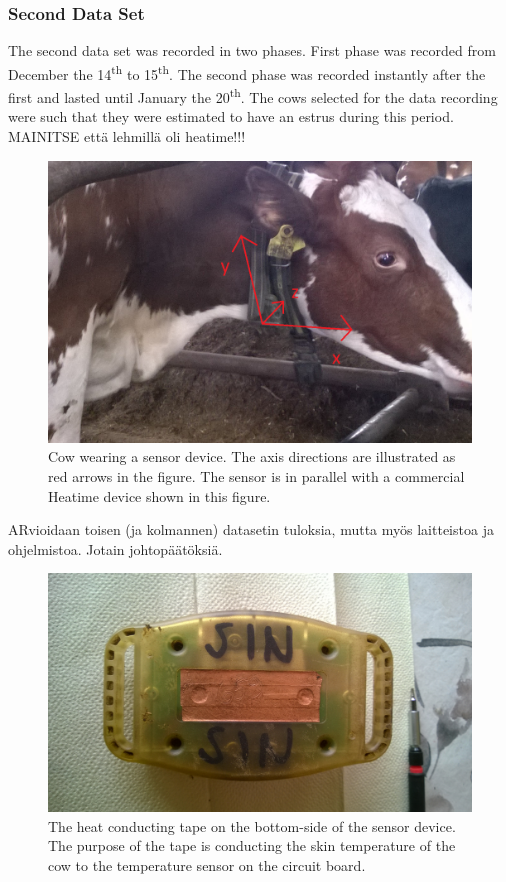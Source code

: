 \documentclass[english,12pt,a4paper,pdftex,elec,utf8]{aaltothesis}
\begin{document}
\subsubsection*{Second Data Set} \label{seconddatasetsection}

The second data set was recorded in two phases. First phase was recorded from December the 14\textsuperscript{th} to 15\textsuperscript{th}. The second phase was recorded instantly after the first and lasted until January the 20\textsuperscript{th}. The cows selected for the data recording were such that they were estimated to have an estrus during this period. \\

MAINITSE että lehmillä oli heatime!!!

\begin{figure}[thb]
\centering
\includegraphics[width = 0.75 \textwidth]{figures/sensorikaulassa1.png}
\caption{Cow wearing a sensor device. The axis directions are illustrated as red arrows in the figure. The sensor is in parallel with a commercial Heatime device shown in this figure.}\label{sensorikaulassakuva}
\end{figure}

ARvioidaan toisen (ja kolmannen) datasetin tuloksia, mutta myös laitteistoa ja ohjelmistoa. Jotain johtopäätöksiä.

\begin{figure}[thb]
\centering
\includegraphics[width = 0.75 \textwidth]{figures/heatConductingTape.jpg}
\caption{The heat conducting tape on the bottom-side of the sensor device. The purpose of the tape is conducting the skin temperature of the cow to the temperature sensor on the circuit board.}\label{heatconductingtape}
\end{figure}
\end{document}
